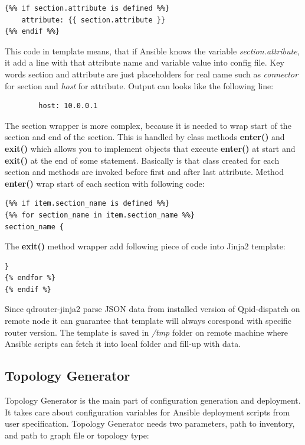 \begin{verbatim}
{%% if section.attribute is defined %%}
    attribute: {{ section.attribute }}
{%% endif %%}
\end{verbatim}

This code in template means, that if Ansible knows the variable \emph{section.attribute}, it add a line with that attribute name and variable value into config file. Key words section and attribute are just placeholders for real name such as \emph{connector} for section and \emph{host} for attribute. Output can looks like the following line:

\begin{verbatim}
		host: 10.0.0.1
\end{verbatim}

The section wrapper is more complex, because it is needed to wrap start of the section and end of the section. This is handled by class methods \textbf{\textunderscore enter\textunderscore ()} and \textbf{\textunderscore exit\textunderscore ()} which allows you to implement objects that execute \textbf{\textunderscore enter\textunderscore ()} at start and \textbf{\textunderscore exit\textunderscore ()} at the end of some statement. Basically is that class created for each section and methods are invoked before first and after last attribute. Method \textbf{\textunderscore enter\textunderscore ()} wrap start of each section with following code:

\begin{verbatim}
{%% if item.section_name is defined %%}
{%% for section_name in item.section_name %%}
section_name {
\end{verbatim}

The \textbf{\textunderscore exit\textunderscore ()} method wrapper add following piece of code into Jinja2 template:
\begin{verbatim}
}
{% endfor %}
{% endif %}
\end{verbatim}

Since qdrouter-jinja2 parse JSON data from installed version of Qpid-dispatch on remote node it can guarantee that template will always corespond with specific router version. The template is saved in \emph{/tmp} folder on remote machine where Ansible scripts can fetch it into local folder and fill-up with data.


\subsection{Topology Generator}
Topology Generator is the main part of configuration generation and deployment. It takes care about configuration variables for Ansible deployment scripts from user specification. Topology Generator needs two parameters, path to inventory, and path to graph file or topology type:

